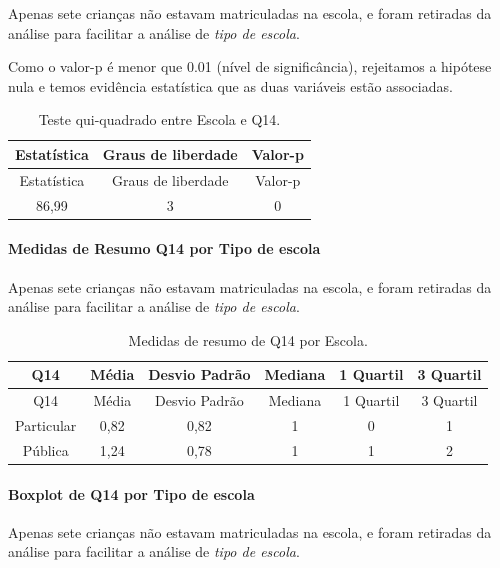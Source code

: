 \documentclass[]{article}
\let\oldparagraph\paragraph
\renewcommand{\paragraph}[1]{\oldparagraph{#1}\mbox{}}
\begin{document}
Apenas sete crianças não estavam matriculadas na escola, e foram retiradas da análise para facilitar a análise de \emph{tipo de escola}.

Como o valor-p é menor que 0.01 (nível de significância), rejeitamos a hipótese nula e temos evidência estatística que as duas variáveis estão associadas.

\begin{longtable}[]{@{}ccc@{}}
\caption{\label{tab:unnamed-chunk-56}Teste qui-quadrado entre Escola e Q14.}\tabularnewline
\toprule
Estatística & Graus de liberdade & Valor-p\tabularnewline
\midrule
\endfirsthead
\toprule
Estatística & Graus de liberdade & Valor-p\tabularnewline
\midrule
\endhead
86,99 & 3 & 0\tabularnewline
\bottomrule
\end{longtable}

\cleardoublepage

\hypertarget{medidas-de-resumo-q14-por-tipo-de-escola}{%
\paragraph{Medidas de Resumo Q14 por Tipo de escola}\label{medidas-de-resumo-q14-por-tipo-de-escola}}

Apenas sete crianças não estavam matriculadas na escola, e foram retiradas da análise para facilitar a análise de \emph{tipo de escola}.

\begin{longtable}[]{@{}cccccc@{}}
\caption{\label{tab:unnamed-chunk-57}Medidas de resumo de Q14 por Escola.}\tabularnewline
\toprule
Q14 & Média & Desvio Padrão & Mediana & 1 Quartil & 3 Quartil\tabularnewline
\midrule
\endfirsthead
\toprule
Q14 & Média & Desvio Padrão & Mediana & 1 Quartil & 3 Quartil\tabularnewline
\midrule
\endhead
Particular & 0,82 & 0,82 & 1 & 0 & 1\tabularnewline
Pública & 1,24 & 0,78 & 1 & 1 & 2\tabularnewline
\bottomrule
\end{longtable}

\hypertarget{boxplot-de-q14-por-tipo-de-escola}{%
\paragraph{Boxplot de Q14 por Tipo de escola}\label{boxplot-de-q14-por-tipo-de-escola}}

Apenas sete crianças não estavam matriculadas na escola, e foram retiradas da análise para facilitar a análise de \emph{tipo de escola}.
\end{document}
